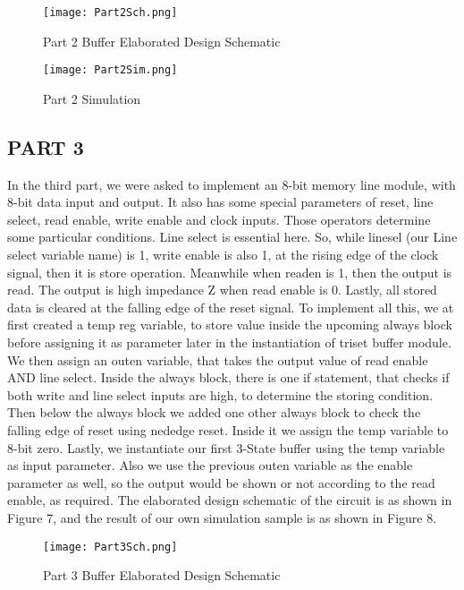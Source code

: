 \documentclass[pdftex,12pt,a4paper]{article}
\begin{document}
\begin{figure}[ht]
	\centering
	\texttt{[image: Part2Sch.png]}
	\caption{Part 2 Buffer Elaborated Design Schematic}
	\label{fig1}
\end{figure}

\begin{figure}[ht]
	\centering
	\texttt{[image: Part2Sim.png]}
	\caption{Part 2 Simulation}
	\label{fig1}
\end{figure}

\newpage
\subsection{PART 3}
In the third part, we were asked to implement an 8-bit memory line module, with 8-bit data input and output. It also has some special parameters of reset, line select, read enable, write enable and clock inputs. Those operators determine some particular conditions. Line select is essential here. So, while linesel (our Line select variable name) is 1, write enable is also 1, at the rising edge of the clock signal, then it is store operation. Meanwhile when readen is 1, then the output is read. The output is high impedance Z when read enable is 0. Lastly, all stored data is cleared at the falling edge of the reset signal. To implement all this, we at first created a temp reg variable, to store value inside the upcoming always block before assigning it as parameter later in the instantiation of triset buffer module. We then assign an outen variable, that takes the output value of read enable AND line select. Inside the always block, there is one if statement, that checks if both write and line select inputs are high, to determine the storing condition. Then below the always block we added one other always block to check the falling edge of reset using nededge reset. Inside it we assign the temp variable to 8-bit zero. Lastly, we instantiate our first 3-State buffer using the temp variable as input parameter. Also we use the previous outen variable as the enable parameter as well, so the output would be shown or not according to the read enable, as required. The elaborated design schematic of the circuit is as shown in Figure 7, and the result of our own simulation sample is as shown in Figure 8. 

\begin{figure}[ht]
	\centering
	\texttt{[image: Part3Sch.png]}
	\caption{Part 3 Buffer Elaborated Design Schematic}
	\label{fig1}
\end{figure}
\end{document}
